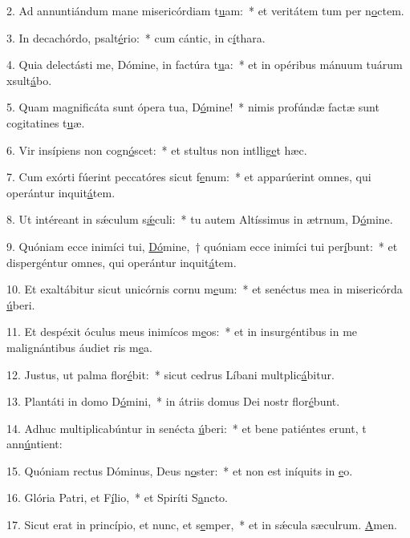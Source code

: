 2. Ad annuntiándum mane misericórdiam t\uline{u}am:~* et veritátem tum per n\uline{o}ctem.\par 
3. In decachórdo, psalt\uline{é}rio:~* cum cántic, in c\uline{í}thara.\par 
4. Quia delectásti me, Dómine, in factúra t\uline{u}a:~* et in opéribus mánuum tuárum xsult\uline{á}bo.\par 
5. Quam magnificáta sunt ópera tua, D\uline{ó}mine!~* nimis profúndæ factæ sunt cogitatines t\uline{u}æ.\par 
6. Vir insípiens non cogn\uline{ó}scet:~* et stultus non intllig\uline{e}t hæc.\par 
7. Cum exórti fúerint peccatóres sicut f\uline{e}num:~* et apparúerint omnes, qui operántur inquit\uline{á}tem.\par 
8. Ut intéreant in sǽculum s\uline{ǽ}culi:~* tu autem Altíssimus in ætrnum, D\uline{ó}mine.\par 
9. Quóniam ecce inimíci tui, \uline{Dó}mine,~† quóniam ecce inimíci tui per\uline{í}bunt:~* et dispergéntur omnes, qui operántur inquit\uline{á}tem.\par 
10. Et exaltábitur sicut unicórnis cornu m\uline{e}um:~* et senéctus mea in misericórda \uline{ú}beri.\par 
11. Et despéxit óculus meus inimícos m\uline{e}os:~* et in insurgéntibus in me malignántibus áudiet ris m\uline{e}a.\par 
12. Justus, ut palma flor\uline{é}bit:~* sicut cedrus Líbani multplic\uline{á}bitur.\par 
13. Plantáti in domo D\uline{ó}mini,~* in átriis domus Dei nostr flor\uline{é}bunt.\par 
14. Adhuc multiplicabúntur in senécta \uline{ú}beri:~* et bene patiéntes erunt, t ann\uline{ú}ntient:\par 
15. Quóniam rectus Dóminus, Deus n\uline{o}ster:~* et non est iníquits in \uline{e}o.\par 
16. Glória Patri, et F\uline{í}lio,~* et Spiríti S\uline{a}ncto.\par 
17. Sicut erat in princípio, et nunc, et s\uline{e}mper,~* et in sǽcula sæculrum. \uline{A}men.\par 
